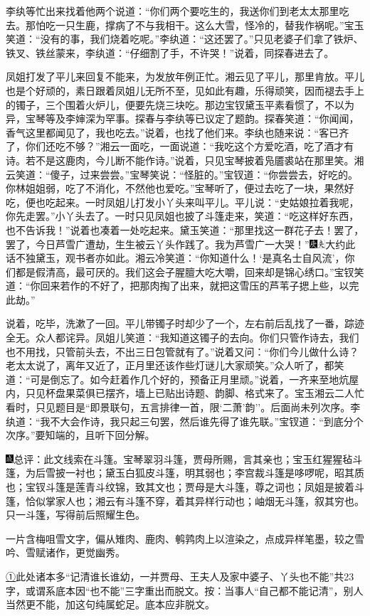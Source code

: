 李纨等忙出来找着他两个说道：``你们两个要吃生的，我送你们到老太太那里吃去。那怕吃一只生鹿，撑病了不与我相干。这么大雪，怪冷的，替我作祸呢。''宝玉笑道：``没有的事，我们烧着吃呢。''李纨道：``这还罢了。''只见老婆子们拿了铁炉、铁叉、铁丝蒙来，李纨道：``仔细割了手，不许哭！''说着，同探春进去了。

凤姐打发了平儿来回复不能来，为发放年例正忙。湘云见了平儿，那里肯放。平儿也是个好顽的，素日跟着凤姐儿无所不至，见如此有趣，乐得顽笑，因而褪去手上的镯子，三个围着火炉儿，便要先烧三块吃。那边宝钗黛玉平素看惯了，不以为异，宝琴等及李婶深为罕事。探春与李纨等已议定了题韵。探春笑道：``你闻闻，香气这里都闻见了，我也吃去。''说着，也找了他们来。李纨也随来说：``客已齐了，你们还吃不够？''湘云一面吃，一面说道：``我吃这个方爱吃酒，吃了酒才有诗。若不是这鹿肉，今儿断不能作诗。''说着，只见宝琴披着凫靥裘站在那里笑。湘云笑道：``傻子，过来尝尝。''宝琴笑说：``怪脏的。''宝钗道：``你尝尝去，好吃的。你林姐姐弱，吃了不消化，不然他也爱吃。''宝琴听了，便过去吃了一块，果然好吃，便也吃起来。一时凤姐儿打发小丫头来叫平儿。平儿说：``史姑娘拉着我呢，你先走罢。''小丫头去了。一时只见凤姐也披了斗篷走来，笑道：``吃这样好东西，也不告诉我！''说着也凑着一处吃起来。黛玉笑道：``那里找这一群花子去！罢了，罢了，今日芦雪广遭劫，生生被云丫头作践了。我为芦雪广一大哭！''{\includegraphics[width=3mm]{../Images/00004}\includegraphics[width=3mm]{../Images/00012}\footnotesize \kaishu 大约此话不独黛玉，观书者亦如此。}湘云冷笑道：``你知道什么！`是真名士自风流'，你们都是假清高，最可厌的。我们这会子腥膻大吃大嚼，回来却是锦心绣口。''宝钗笑道：``你回来若作的不好了，把那肉掏了出来，就把这雪压的芦苇子揌上些，以完此劫。''

说着，吃毕，洗漱了一回。平儿带镯子时却少了一个，左右前后乱找了一番，踪迹全无。众人都诧异。凤姐儿笑道：``我知道这镯子的去向。你们只管作诗去，我们也不用找，只管前头去，不出三日包管就有了。''说着又问：``你们今儿做什么诗？老太太说了，离年又近了，正月里还该作些灯谜儿大家顽笑。''众人听了，都笑道：``可是倒忘了。如今赶着作几个好的，预备正月里顽。''说着，一齐来至地炕屋内，只见杯盘果菜俱已摆齐，墙上已贴出诗题、韵脚、格式来了。宝玉湘云二人忙看时，只见题目是``即景联句，五言排律一首，限`二萧'韵''。后面尚未列次序。李纨道：``我不大会作诗，我只起三句罢，然后谁先得了谁先联。''宝钗道：``到底分个次序。''要知端的，且听下回分解。

{\includegraphics[width=3mm]{../Images/00005}总评：此文线索在斗篷。宝琴翠羽斗篷，贾母所赐，言其亲也；宝玉红猩猩毡斗篷，为后雪披一衬也；黛玉白狐皮斗篷，明其弱也；李宫裁斗篷是哆}啰{呢，昭其质也；宝钗斗篷是莲青斗纹锦，致其文也；贾母是大斗篷，尊之词也；凤姐是披着斗篷，恰似掌家人也；湘云有斗篷不穿，着其异样行动也；岫烟无斗篷，叙其穷也。只一斗篷，写得前后照耀生色。}

{一片含梅咀雪文字，偏从雉肉、鹿肉、鹌鹑肉上以渲染之，点成异样笔墨，较之雪吟、雪赋诸作，更觉幽秀。}

{\href{../Text/part0053_split_000.html\#navto_1_a}{①}此处诸本多``记清谁长谁幼，一并贾母、王夫人及家中婆子、丫头也不能''共23字，或谓系底本因``也不能''三字重出而脱文。按：当事人``自己都不能记清''，别人当然更不能，加这句纯属蛇足。底本应非脱文。}
